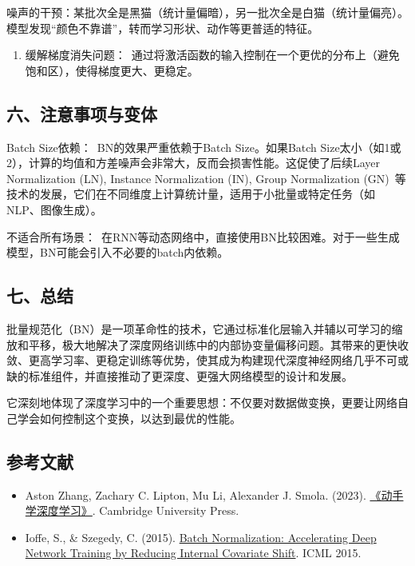 噪声的干预：某批次全是黑猫（统计量偏暗），另一批次全是白猫（统计量偏亮）。模型发现``颜色不靠谱''，转而学习形状、动作等更普适的特征。

\begin{enumerate}
\def\labelenumi{\arabic{enumi}.}
\setcounter{enumi}{3}
\tightlist
\item
  缓解梯度消失问题：~通过将激活函数的输入控制在一个更优的分布上（避免饱和区），使得梯度更大、更稳定。
\end{enumerate}

\hypertarget{ux516dux6ce8ux610fux4e8bux9879ux4e0eux53d8ux4f53}{%
\subsection{六、注意事项与变体}\label{ux516dux6ce8ux610fux4e8bux9879ux4e0eux53d8ux4f53}}

Batch Size依赖：~BN的效果严重依赖于Batch Size。如果Batch Size太小（如1或2），计算的均值和方差噪声会非常大，反而会损害性能。这促使了后续Layer Normalization (LN), Instance Normalization (IN), Group Normalization (GN)~等技术的发展，它们在不同维度上计算统计量，适用于小批量或特定任务（如NLP、图像生成）。

不适合所有场景：~在RNN等动态网络中，直接使用BN比较困难。对于一些生成模型，BN可能会引入不必要的batch内依赖。

\hypertarget{ux4e03ux603bux7ed3}{%
\subsection{七、总结}\label{ux4e03ux603bux7ed3}}

批量规范化（BN）是一项革命性的技术，它通过标准化层输入并辅以可学习的缩放和平移，极大地解决了深度网络训练中的内部协变量偏移问题。其带来的更快收敛、更高学习率、更稳定训练等优势，使其成为构建现代深度神经网络几乎不可或缺的标准组件，并直接推动了更深度、更强大网络模型的设计和发展。

它深刻地体现了深度学习中的一个重要思想：不仅要对数据做变换，更要让网络自己学会如何控制这个变换，以达到最优的性能。

\hypertarget{ux53c2ux8003ux6587ux732e-6}{%
\subsection{参考文献}\label{ux53c2ux8003ux6587ux732e-6}}

\begin{itemize}
\tightlist
\item
  Aston Zhang, Zachary C. Lipton, Mu Li, Alexander J. Smola. (2023). \href{https://zh.d2l.ai/}{《动手学深度学习》}. Cambridge University Press.
\item
  Ioffe, S., \& Szegedy, C. (2015). \href{https://arxiv.org/abs/1502.03167}{Batch Normalization: Accelerating Deep Network Training by Reducing Internal Covariate Shift}. ICML 2015.
\end{itemize}

